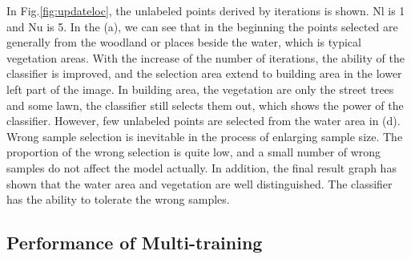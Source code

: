 \documentclass{isprs} %
\begin{document}
In Fig.\ref{fig:updateloc}, the unlabeled points derived by iterations is shown. Nl is 1 and Nu is 5. In the (a), we can see that in the beginning the points selected are generally from the woodland or places beside the water, which is typical vegetation areas. With the increase of the number of iterations, the ability of the classifier is improved, and the selection area extend to building area in the lower left part of the image. In building area, the vegetation are only the street trees and some lawn, the classifier still selects them out, which shows the power of the classifier. However, few unlabeled points are selected from the water area in (d). Wrong sample selection is inevitable in the process of enlarging sample size. The proportion of the wrong selection is quite low, and a small number of wrong samples do not affect the model actually. In addition, the final result graph has shown that the water area and vegetation are well distinguished. The classifier has the ability to tolerate the wrong samples.

\subsection{Performance of Multi-training}
\end{document}
